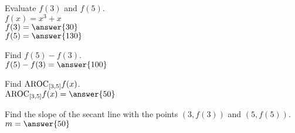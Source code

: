 \documentclass{ximera}
\author{David Kish}
\begin{document}
\begin{exercise}
Evaluate $f(3)$ and $f(5)$.\\
$f(x)= x^3+x$\\
$f(3)=\answer{30}$\\
$f(5)=\answer{130}$
\end{exercise}
\begin{exercise}
Find $f(5)-f(3)$.\\
$f(5)-f(3)=\answer{100}$
\end{exercise}
\begin{exercise}
Find $\mathrm{AROC}_{[3, 5]} f(x)$.\\
$\av_{[3, 5]} f(x) = \answer{50}$
\end{exercise}
\begin{exercise}
Find the slope of the secant line with the points $(3, f(3))$ and $(5, f(5))$.\\
$m=\answer{50}$
\end{exercise}
\end{document}
